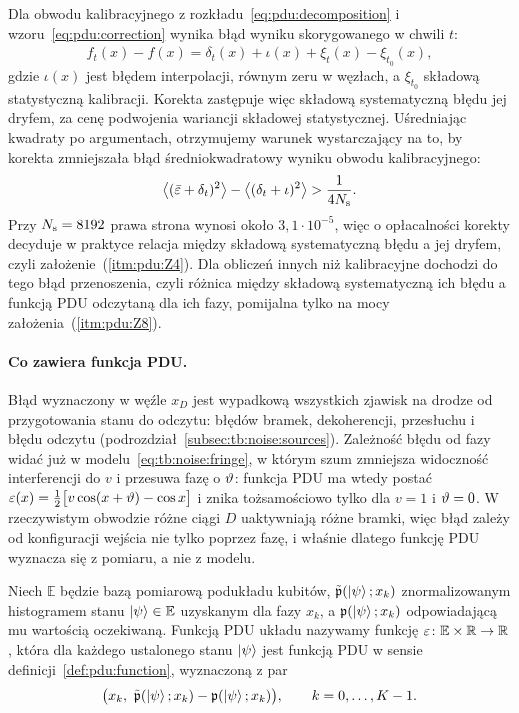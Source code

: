 Dla obwodu kalibracyjnego z rozkładu~\eqref{eq:pdu:decomposition} i wzoru~\eqref{eq:pdu:correction} wynika błąd wyniku skorygowanego w chwili $t$:
\begin{equation}\label{eq:pdu:residual}
\hat{f}_t(x)-f(x)=\delta_t(x)+\iota(x)+\xi_t(x)-\xi_{t_0}(x),
\end{equation}
gdzie $\iota(x)$ jest błędem interpolacji, równym zeru w węzłach, a $\xi_{t_0}$ składową statystyczną kalibracji.
Korekta zastępuje więc składową systematyczną błędu jej dryfem, za cenę podwojenia wariancji składowej statystycznej.
Uśredniając kwadraty po argumentach, otrzymujemy warunek wystarczający na to, by korekta zmniejszała błąd średniokwadratowy wyniku obwodu kalibracyjnego:
\begin{equation}\label{eq:pdu:criterion}
\bigl\langle(\bar{\varepsilon}+\delta_t)^2\bigr\rangle-\bigl\langle(\delta_t+\iota)^2\bigr\rangle>\frac{1}{4N_{\mathrm{s}}}.
\end{equation}
Przy $N_{\mathrm{s}}=8192$ prawa strona wynosi około $3{,}1\cdot10^{-5}$, więc o opłacalności korekty decyduje w praktyce relacja między składową systematyczną błędu a jej dryfem, czyli założenie~(\ref{itm:pdu:Z4}).
Dla obliczeń innych niż kalibracyjne dochodzi do tego błąd przenoszenia, czyli różnica między składową systematyczną ich błędu a funkcją PDU odczytaną dla ich fazy, pomijalna tylko na mocy założenia~(\ref{itm:pdu:Z8}).

\paragraph{Co zawiera funkcja PDU.}
Błąd wyznaczony w węźle $x_D$ jest wypadkową wszystkich zjawisk na drodze od przygotowania stanu do odczytu: błędów bramek, dekoherencji, przesłuchu i błędu odczytu (podrozdział~\ref{subsec:tb:noise:sources}).
Zależność błędu od fazy widać już w modelu~\eqref{eq:tb:noise:fringe}, w którym szum zmniejsza widoczność interferencji do $v$ i przesuwa fazę o $\vartheta$: funkcja PDU ma wtedy postać $\varepsilon(x)=\tfrac{1}{2}\bigl[v\cos(x+\vartheta)-\cos x\bigr]$ i znika tożsamościowo tylko dla $v=1$ i $\vartheta=0$.
W rzeczywistym obwodzie różne ciągi $D$ uaktywniają różne bramki, więc błąd zależy od konfiguracji wejścia nie tylko poprzez fazę, i właśnie dlatego funkcję PDU wyznacza się z pomiaru, a nie z modelu.

\begin{Definition}\label{def:pdu:general}
Niech $\mathbb{E}$ będzie bazą pomiarową podukładu kubitów, $\tilde{\mathfrak{p}}(\ket{\psi};x_k)$ znormalizowanym histogramem stanu $\ket{\psi}\in\mathbb{E}$ uzyskanym dla fazy $x_k$, a $\mathfrak{p}(\ket{\psi};x_k)$ odpowiadającą mu wartością oczekiwaną.
Funkcją PDU układu nazywamy funkcję $\varepsilon\colon\mathbb{E}\times\mathbb{R}\to\mathbb{R}$, która dla każdego ustalonego stanu $\ket{\psi}$ jest funkcją PDU w sensie definicji~\ref{def:pdu:function}, wyznaczoną z par
\begin{equation}\label{eq:pdu:general}
\bigl(x_k,\ \tilde{\prob}(\ket{\psi};x_k)-\prob(\ket{\psi};x_k)\bigr),\qquad k=0,\dots,K-1 .
\end{equation}
\end{Definition}

